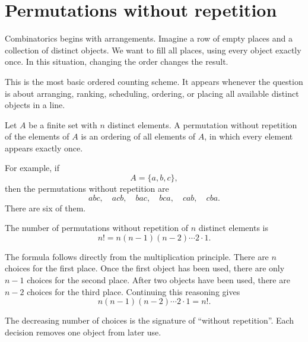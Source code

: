 \section{Permutations without repetition}

Combinatorics begins with arrangements. Imagine a row of empty places and a collection of distinct objects. We want to fill all places, using every object exactly once. In this situation, changing the order changes the result.

This is the most basic ordered counting scheme. It appears whenever the question is about arranging, ranking, scheduling, ordering, or placing all available distinct objects in a line.

\begin{definitionbox}
Let \(A\) be a finite set with \(n\) distinct elements. A permutation without repetition of the elements of \(A\) is an ordering of all elements of \(A\), in which every element appears exactly once.
\end{definitionbox}

For example, if
\[
A=\{a,b,c\},
\]
then the permutations without repetition are
\[
abc,\quad acb,\quad bac,\quad bca,\quad cab,\quad cba.
\]
There are six of them.

\begin{center}
\end{center}

\begin{theorembox}
The number of permutations without repetition of \(n\) distinct elements is
\[
n! = n(n-1)(n-2)\cdots 2\cdot 1.
\]
\end{theorembox}

The formula follows directly from the multiplication principle. There are \(n\) choices for the first place. Once the first object has been used, there are only \(n-1\) choices for the second place. After two objects have been used, there are \(n-2\) choices for the third place. Continuing this reasoning gives
\[
n(n-1)(n-2)\cdots 2\cdot 1=n!.
\]

The decreasing number of choices is the signature of ``without repetition''. Each decision removes one object from later use.

